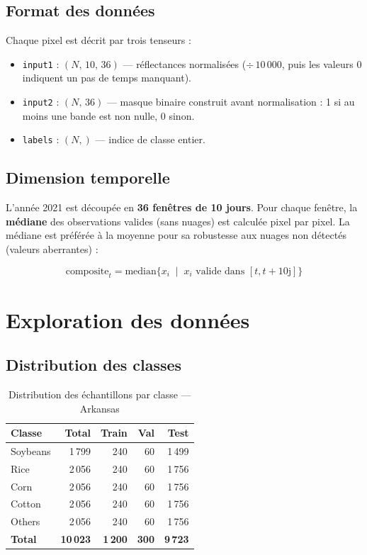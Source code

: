 \subsection{Format des données}

Chaque pixel est décrit par trois tenseurs :

\begin{itemize}
  \item \texttt{input1} : $(N,\,10,\,36)$ — réflectances normalisées
        ($\div\,10\,000$, puis les valeurs 0 indiquent un pas de temps manquant).
  \item \texttt{input2} : $(N,\,36)$ — masque binaire construit avant
        normalisation : 1 si au moins une bande est non nulle, 0 sinon.
  \item \texttt{labels} : $(N,)$ — indice de classe entier.
\end{itemize}

\subsection{Dimension temporelle}

L'année 2021 est découpée en \textbf{36 fenêtres de 10 jours}. Pour
chaque fenêtre, la \textbf{médiane} des observations valides (sans nuages)
est calculée pixel par pixel. La médiane est préférée à la moyenne pour
sa robustesse aux nuages non détectés (valeurs aberrantes) :

\begin{equation}
  \text{composite}_t = \text{median}\!\big\{x_i \;\mid\; x_i \text{ valide dans } [t, t+10\text{j}]\big\}
\end{equation}

\section{Exploration des données}
\label{sec:exploration}

\subsection{Distribution des classes}

\begin{table}[H]
\centering
\caption{Distribution des échantillons par classe — Arkansas}
\label{tab:dist_ark}
\begin{tabular}{lrrrr}
\toprule
\textbf{Classe} & \textbf{Total} & \textbf{Train} & \textbf{Val} & \textbf{Test} \\
\midrule
Soybeans & 1\,799 & 240 & 60 & 1\,499 \\
Rice     & 2\,056 & 240 & 60 & 1\,756 \\
Corn     & 2\,056 & 240 & 60 & 1\,756 \\
Cotton   & 2\,056 & 240 & 60 & 1\,756 \\
Others   & 2\,056 & 240 & 60 & 1\,756 \\
\midrule
\textbf{Total} & \textbf{10\,023} & \textbf{1\,200} & \textbf{300} & \textbf{9\,723} \\
\bottomrule
\end{tabular}
\end{table}

